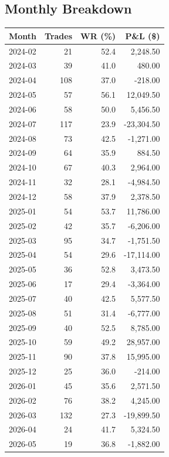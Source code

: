 \documentclass[11pt,a4paper,twoside]{article}
\begin{document}
\subsection{Monthly Breakdown}
\noindent\begin{center}
\begin{tabular}{>{\color{txtmain}}l rrr}
\toprule
\rowcolor{cardbg}
\textbf{Month} & \textbf{Trades} & \textbf{WR (\%)} & \textbf{P\&L (\$)} \\
\midrule
2024-02 & 21 & 52.4 & \textcolor{wingreen}{2,248.50} \\
2024-03 & 39 & 41.0 & \textcolor{wingreen}{480.00} \\
2024-04 & 108 & 37.0 & \textcolor{lossred}{-218.00} \\
2024-05 & 57 & 56.1 & \textcolor{wingreen}{12,049.50} \\
2024-06 & 58 & 50.0 & \textcolor{wingreen}{5,456.50} \\
2024-07 & 117 & 23.9 & \textcolor{lossred}{-23,304.50} \\
2024-08 & 73 & 42.5 & \textcolor{lossred}{-1,271.00} \\
2024-09 & 64 & 35.9 & \textcolor{wingreen}{884.50} \\
2024-10 & 67 & 40.3 & \textcolor{wingreen}{2,964.00} \\
2024-11 & 32 & 28.1 & \textcolor{lossred}{-4,984.50} \\
2024-12 & 58 & 37.9 & \textcolor{wingreen}{2,378.50} \\
2025-01 & 54 & 53.7 & \textcolor{wingreen}{11,786.00} \\
2025-02 & 42 & 35.7 & \textcolor{lossred}{-6,206.00} \\
2025-03 & 95 & 34.7 & \textcolor{lossred}{-1,751.50} \\
2025-04 & 54 & 29.6 & \textcolor{lossred}{-17,114.00} \\
2025-05 & 36 & 52.8 & \textcolor{wingreen}{3,473.50} \\
2025-06 & 17 & 29.4 & \textcolor{lossred}{-3,364.00} \\
2025-07 & 40 & 42.5 & \textcolor{wingreen}{5,577.50} \\
2025-08 & 51 & 31.4 & \textcolor{lossred}{-6,777.00} \\
2025-09 & 40 & 52.5 & \textcolor{wingreen}{8,785.00} \\
2025-10 & 59 & 49.2 & \textcolor{wingreen}{28,957.00} \\
2025-11 & 90 & 37.8 & \textcolor{wingreen}{15,995.00} \\
2025-12 & 25 & 36.0 & \textcolor{lossred}{-214.00} \\
2026-01 & 45 & 35.6 & \textcolor{wingreen}{2,571.50} \\
2026-02 & 76 & 38.2 & \textcolor{wingreen}{4,245.00} \\
2026-03 & 132 & 27.3 & \textcolor{lossred}{-19,899.50} \\
2026-04 & 24 & 41.7 & \textcolor{wingreen}{5,324.50} \\
2026-05 & 19 & 36.8 & \textcolor{lossred}{-1,882.00} \\
\bottomrule
\end{tabular}
\end{center}
\end{document}
